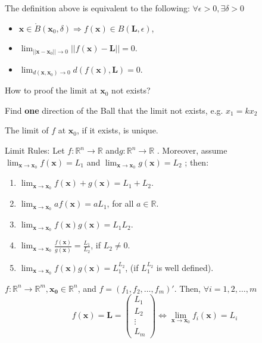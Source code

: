 \begin{remark*}
    The definition above is equivalent to the following:
    $\forall \epsilon > 0, \exists \delta > 0$
    \begin{itemize}
        \item $\mathbf{x} \in \mathring{B}(\mathbf{x}_0, \delta) \Rightarrow f(\mathbf{x}) \in B(\mathbf{L}, \epsilon)$,
        \item $\lim_{||\mathbf{x} - \mathbf{x}_0||\rightarrow 0}||f(\mathbf{x}) - \mathbf{L}|| = 0$.
        \item $\lim_{d(\mathbf{x},\mathbf{x}_0)\rightarrow 0}d(f(\mathbf{x}),\mathbf{L}) = 0$.
    \end{itemize}
\end{remark*}

\begin{remark*}
    How to proof the limit at \(\mathbf{x}_0\) not exists?

    Find \textbf{one} direction of the Ball that the limit not exists, e.g. \(x_1=kx_2\)
\end{remark*}

\begin{proposition}
    The limit of \(f\) at \(\mathbf{x}_0\), if it exists, is unique.
\end{proposition}

Limit Rules: Let \(f:\mathbb{R}^{n}\longrightarrow \mathbb{R}\) and\(g:\mathbb{R}^{n}\longrightarrow \mathbb{R}\) . Moreover, assume \(\lim_{\mathbf{x}\to \mathbf{x}_0}f(\mathbf{x}) = L_1\) and \(\lim_{\mathbf{x}\to \mathbf{x}_0}g(\mathbf{x}) = L_2\) ; then:
\begin{enumerate}
    \item \(\lim_{\mathbf{x}\to \mathbf{x}_0}f(\mathbf{x}) + g(\mathbf{x}) = L_1 + L_2.\)
    \item \(\lim_{\mathbf{x}\to \mathbf{x}_0}a f(\mathbf{x}) = a L_1\), for all \(a\in \mathbb{R}\).
    \item \(\lim_{\mathbf{x}\to \mathbf{x}_0}f(\mathbf{x})g(\mathbf{x}) = L_1L_2\).
    \item \(\lim_{\mathbf{x}\to \mathbf{x}_0}\frac{f(\mathbf{x})}{g(\mathbf{x})} = \frac{L_1}{L_2}\), if \(L_2\neq 0\).
    \item \(\lim_{\mathbf{x}\to \mathbf{x}_0}f(\mathbf{x})g(\mathbf{x}) = L_1^{L_2}\), (if \(L_1^{L_2}\) is well defined).
\end{enumerate}


\begin{proposition}
    \(f: \mathbb{R}^{n} \rightarrow \mathbb{R}^{m}, \mathbf{x_{0}} \in \mathbb{R}^{n}\), and \(f = (f_{1}, f_{2}, \ldots , f_{m})'\). Then, \(\forall i = 1,2, \ldots , m\)
    \[
        f(\mathbf{x}) = \mathbf{L} = \left( \begin{array}{c}L_{1} \\ L_{2} \\ \vdots \\ L_{m} \end{array} \right) \iff \lim_{\mathbf{x} \rightarrow \mathbf{x}_{0}} f_{i}(\mathbf{x}) = L_{i}
    \]
\end{proposition}


